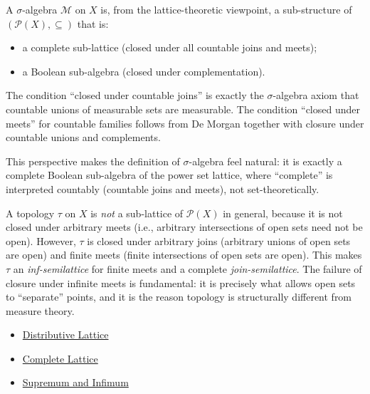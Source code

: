 
\begin{remark*}[Exposition]
A $\sigma$-algebra $\mathcal{M}$ on $X$ is, from the lattice-theoretic
viewpoint, a sub-structure of $(\mathcal{P}(X), \subseteq)$ that is:
\begin{itemize}
  \item a complete sub-lattice (closed under all countable joins and meets);
  \item a Boolean sub-algebra (closed under complementation).
\end{itemize}
The condition ``closed under countable joins'' is exactly the $\sigma$-algebra
axiom that countable unions of measurable sets are measurable.  The condition
``closed under meets'' for countable families follows from De Morgan together
with closure under countable unions and complements.

This perspective makes the definition of $\sigma$-algebra feel natural: it is
exactly a complete Boolean sub-algebra of the power set lattice, where
``complete'' is interpreted countably (countable joins and meets), not
set-theoretically.
\end{remark*}

\begin{remark*}[Exposition]
A topology $\tau$ on $X$ is \emph{not} a sub-lattice of $\mathcal{P}(X)$ in
general, because it is not closed under arbitrary meets (i.e., arbitrary
intersections of open sets need not be open).  However, $\tau$ is closed under
arbitrary joins (arbitrary unions of open sets are open) and finite meets
(finite intersections of open sets are open).  This makes $\tau$ an
\emph{inf-semilattice} for finite meets and a complete \emph{join-semilattice}.
The failure of closure under infinite meets is fundamental: it is precisely
what allows open sets to ``separate'' points, and it is the reason topology
is structurally different from measure theory.
\end{remark*}

\begin{dependencies}
\begin{itemize}
  \item \hyperref[def:distributive-lattice]{Distributive Lattice}
  \item \hyperref[def:complete-lattice]{Complete Lattice}
  \item \hyperref[def:sup-inf]{Supremum and Infimum}
\end{itemize}
\end{dependencies}

